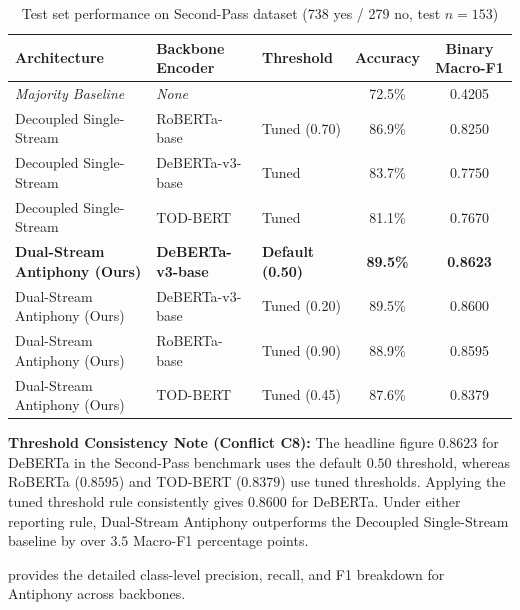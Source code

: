 \begin{table}[htbp]
  \centering
  \small
  \caption{Test set performance on Second-Pass dataset (738 yes / 279 no, test $n=153$)}
  \label{tab:results-part2}
  \begin{tabularx}{\textwidth}{ll>{\centering\arraybackslash}Xcc}
    \toprule
    \textbf{Architecture} & \textbf{Backbone Encoder} & \textbf{Threshold} & \textbf{Accuracy} & \textbf{Binary Macro-F1} \\
    \midrule
    \textit{Majority Baseline} & \textit{None} & 0.50 & 72.5\% & 0.4205 \\
    \midrule
    \rowcolor{lightbg}
    Decoupled Single-Stream & RoBERTa-base & Tuned (0.70) & 86.9\% & 0.8250 \\
    Decoupled Single-Stream & DeBERTa-v3-base & Tuned & 83.7\% & 0.7750 \\
    \rowcolor{lightbg}
    Decoupled Single-Stream & TOD-BERT & Tuned & 81.1\% & 0.7670 \\
    \midrule
    \textbf{Dual-Stream Antiphony (Ours)} & \textbf{DeBERTa-v3-base} & \textbf{Default (0.50)} & \textbf{89.5\%} & \textbf{0.8623} \\
    \rowcolor{lightbg}
    Dual-Stream Antiphony (Ours) & DeBERTa-v3-base & Tuned (0.20) & 89.5\% & 0.8600 \\
    Dual-Stream Antiphony (Ours) & RoBERTa-base & Tuned (0.90) & 88.9\% & 0.8595 \\
    \rowcolor{lightbg}
    Dual-Stream Antiphony (Ours) & TOD-BERT & Tuned (0.45) & 87.6\% & 0.8379 \\
    \bottomrule
  \end{tabularx}
\end{table}

\textbf{Threshold Consistency Note (Conflict C8):} The headline figure $0.8623$ for DeBERTa in the Second-Pass benchmark uses the default $0.50$ threshold, whereas RoBERTa ($0.8595$) and TOD-BERT ($0.8379$) use tuned thresholds. Applying the tuned threshold rule consistently gives $0.8600$ for DeBERTa. Under either reporting rule, Dual-Stream Antiphony outperforms the Decoupled Single-Stream baseline by over $3.5$ Macro-F1 percentage points.

 provides the detailed class-level precision, recall, and F1 breakdown for Antiphony across backbones.

